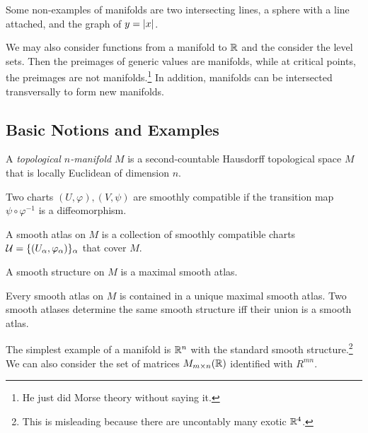 \documentclass[twoside, 10pt]{article}
\begin{document}
    \begin{exm} Some non-examples of manifolds are two intersecting lines, a
    sphere with a line attached, and the graph of $y = \lvert x\rvert$.  \end{exm}

    We may also consider functions from a manifold to $\mathbb{R}$ and the consider the
    level sets. Then the preimages of generic values are manifolds, while at
    critical points, the preimages are not manifolds.\footnote{He just did
    Morse theory without saying it.} In addition, manifolds can be intersected
    transversally to form new manifolds.

    \subsection{Basic Notions and Examples}%
    \label{sub:basic_notions_and_examples}
    
    
    \begin{defn} A \textit{topological $n$-manifold} $M$ is a second-countable
    Hausdorff topological space $M$ that is locally Euclidean of dimension $n$.
\end{defn}

    \begin{defn} Two charts $(U, \varphi), (V, \psi)$ are smoothly compatible
    if the transition map $\psi \circ \varphi^{-1}$ is a diffeomorphism.
\end{defn}

    \begin{defn} A smooth atlas on $M$ is a collection of smoothly compatible
    charts $\mathcal{U} = \{(U_{\alpha}, \varphi_{\alpha})\}_{\alpha}$ that cover
$M$.  \end{defn}

    \begin{defn} A smooth structure on $M$ is a maximal smooth atlas.
    \end{defn}

    \begin{lem} Every smooth atlas on $M$ is contained in a unique maximal
    smooth atlas. Two smooth atlases determine the same smooth structure iff
their union is a smooth atlas.  \end{lem}

    \begin{exm} The simplest example of a manifold is $\mathbb{R}^n$ with the standard
        smooth structure.\footnote{This is misleading because there are
        uncontably many exotic $\mathbb{R}^4$.} We can also consider the set of
        matrices $M_{m \times n}(\mathbb{R})$ identified with $R^{mn}$.  \end{exm}
\end{document}
